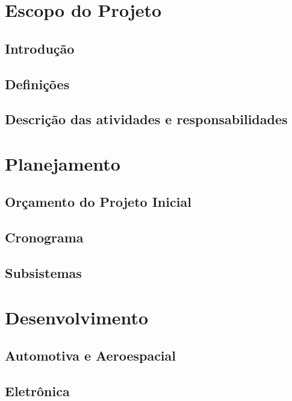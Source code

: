 \part{Escopo do Projeto}
\chapter{Introdução}


\chapter{Definições}


\chapter{Descrição das atividades e responsabilidades}


\openany

\part{Planejamento}
\chapter{Orçamento do Projeto Inicial}


\chapter{Cronograma}


\chapter{Subsistemas}


\part{Desenvolvimento}

\chapter{Automotiva e Aeroespacial}


\chapter{Eletrônica}


